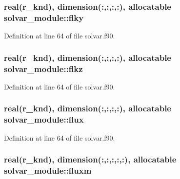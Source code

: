 \hypertarget{classsolvar__module_a3fbb689b872fa887a3ecdd93d9a97ecf}{
\subsubsection[{flky}]{\setlength{\rightskip}{0pt plus 5cm}real(r\-\_\-knd), dimension(\-:,\-:,\-:,\-:), allocatable solvar\-\_\-module\-::flky}}\label{classsolvar__module_a3fbb689b872fa887a3ecdd93d9a97ecf}


Definition at line 64 of file solvar.\-f90.

\hypertarget{classsolvar__module_ac1a71548938a72b9fa42b45c11bca3a1}{
\subsubsection[{flkz}]{\setlength{\rightskip}{0pt plus 5cm}real(r\-\_\-knd), dimension(\-:,\-:,\-:,\-:), allocatable solvar\-\_\-module\-::flkz}}\label{classsolvar__module_ac1a71548938a72b9fa42b45c11bca3a1}


Definition at line 64 of file solvar.\-f90.

\hypertarget{classsolvar__module_acee52bd8211ef05645267a7f4cc9ec28}{
\subsubsection[{flux}]{\setlength{\rightskip}{0pt plus 5cm}real(r\-\_\-knd), dimension(\-:,\-:,\-:,\-:), allocatable solvar\-\_\-module\-::flux}}\label{classsolvar__module_acee52bd8211ef05645267a7f4cc9ec28}


Definition at line 64 of file solvar.\-f90.

\hypertarget{classsolvar__module_a0e9cb7f402640f1adaeeba1ca33718eb}{
\subsubsection[{fluxm}]{\setlength{\rightskip}{0pt plus 5cm}real(r\-\_\-knd), dimension(\-:,\-:,\-:,\-:,\-:), allocatable solvar\-\_\-module\-::fluxm}}\label{classsolvar__module_a0e9cb7f402640f1adaeeba1ca33718eb}


